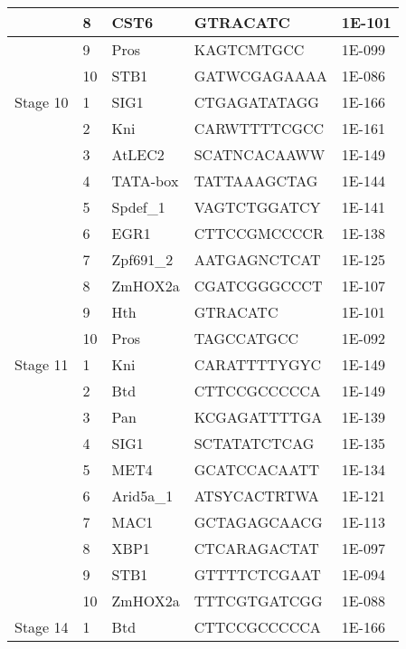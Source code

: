 \begin{center}
\begin{longtable}{|l|l|l|l|l|}
         & 8    & CST6          & GTRACATC           & 1E-101  \\ \hline
         & 9    & Pros          & KAGTCMTGCC         & 1E-099  \\ \hline
         & 10   & STB1          & GATWCGAGAAAA       & 1E-086  \\ \hline
Stage 10 & 1    & SIG1          & CTGAGATATAGG       & 1E-166  \\ \hline
         & 2    & Kni           & CARWTTTTCGCC       & 1E-161  \\ \hline
         & 3    & AtLEC2        & SCATNCACAAWW       & 1E-149  \\ \hline
         & 4    & TATA-box      & TATTAAAGCTAG       & 1E-144  \\ \hline
         & 5    & Spdef\_1      & VAGTCTGGATCY       & 1E-141  \\ \hline
         & 6    & EGR1          & CTTCCGMCCCCR       & 1E-138  \\ \hline
         & 7    & Zpf691\_2     & AATGAGNCTCAT       & 1E-125  \\ \hline
         & 8    & ZmHOX2a       & CGATCGGGCCCT       & 1E-107  \\ \hline
         & 9    & Hth           & GTRACATC           & 1E-101  \\ \hline
         & 10   & Pros          & TAGCCATGCC         & 1E-092  \\ \hline
Stage 11 & 1    & Kni           & CARATTTTYGYC       & 1E-149  \\ \hline
         & 2    & Btd           & CTTCCGCCCCCA       & 1E-149  \\ \hline
         & 3    & Pan           & KCGAGATTTTGA       & 1E-139  \\ \hline
         & 4    & SIG1          & SCTATATCTCAG       & 1E-135  \\ \hline
         & 5    & MET4          & GCATCCACAATT       & 1E-134  \\ \hline
         & 6    & Arid5a\_1     & ATSYCACTRTWA       & 1E-121  \\ \hline
         & 7    & MAC1          & GCTAGAGCAACG       & 1E-113  \\ \hline
         & 8    & XBP1          & CTCARAGACTAT       & 1E-097  \\ \hline
         & 9    & STB1          & GTTTTCTCGAAT       & 1E-094  \\ \hline
         & 10   & ZmHOX2a       & TTTCGTGATCGG       & 1E-088  \\ \hline
Stage 14 & 1    & Btd           & CTTCCGCCCCCA       & 1E-166  \\ \hline

\end{longtable}
\end{center}
